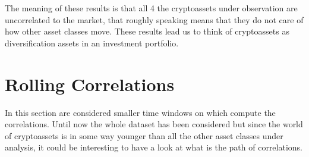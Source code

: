 \begin{table}[H]
    \newline
    \vspace*{0.3 cm}
    \newline
    \caption{hypothesis test xrp correlations}
    \label{tante4}
\end{table}
\bigskip

The meaning of these results is that all 4 the cryptoassets under observation are uncorrelated to the market, that roughly speaking means that they do not care of how other asset classes move. These results lead us to think of cryptoassets as diversification assets in an investment portfolio.

\section{Rolling Correlations}

In this section are considered smaller time windows on which compute the correlations. Until now the whole dataset has been considered but since the world of cryptoassets is in some way younger than all the other asset classes under analysis, it could be interesting to have a look at what is the path of correlations.
\noindent

